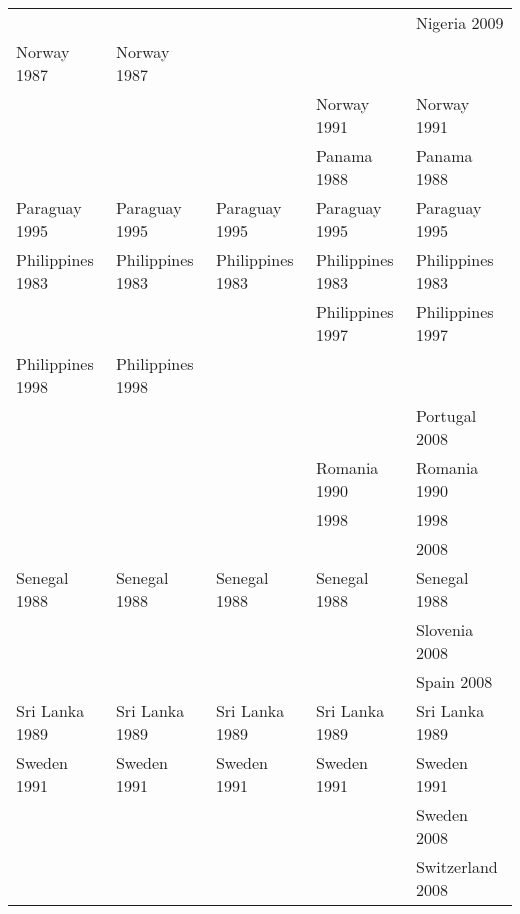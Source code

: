 \begin{table}[ht]
{\begin{tabular}{lllll}
   &  &  &  & Nigeria 2009\cellcolor[gray]{0.5} \\ 
  Norway 1987\cellcolor[gray]{0.5} & Norway 1987\cellcolor[gray]{0.5} &  &  &  \\ 
   &  &  & Norway 1991\cellcolor[gray]{0.5} & Norway 1991\cellcolor[gray]{0.5} \\ 
   &  &  & Panama 1988\cellcolor[gray]{0.5} & Panama 1988\cellcolor[gray]{0.5} \\ 
  Paraguay 1995\cellcolor[gray]{0.5} & Paraguay 1995\cellcolor[gray]{0.5} & Paraguay 1995\cellcolor[gray]{0.5} & Paraguay 1995\cellcolor[gray]{0.5} & Paraguay 1995\cellcolor[gray]{0.5} \\ 
  Philippines 1983\cellcolor[gray]{1} & Philippines 1983\cellcolor[gray]{1} & Philippines 1983\cellcolor[gray]{1} & Philippines 1983\cellcolor[gray]{1} & Philippines 1983\cellcolor[gray]{1} \\ 
   &  &  & Philippines 1997\cellcolor[gray]{0.5} & Philippines 1997\cellcolor[gray]{0.5} \\ 
  Philippines 1998\cellcolor[gray]{0.5} & Philippines 1998\cellcolor[gray]{0.5} &  &  &  \\ 
   &  &  &  & Portugal 2008\cellcolor[gray]{0.5} \\ 
   &  &  & Romania 1990\cellcolor[gray]{0.75} & Romania 1990\cellcolor[gray]{0.75} \\ 
   &  &  &  1998\cellcolor[gray]{0.5} &  1998\cellcolor[gray]{0.5} \\ 
   &  &  &  &  2008\cellcolor[gray]{0.5} \\ 
  Senegal 1988\cellcolor[gray]{0.5} & Senegal 1988\cellcolor[gray]{0.5} & Senegal 1988\cellcolor[gray]{0.5} & Senegal 1988\cellcolor[gray]{0.5} & Senegal 1988\cellcolor[gray]{0.5} \\ 
   &  &  &  & Slovenia 2008\cellcolor[gray]{0.5} \\ 
   &  &  &  & Spain 2008\cellcolor[gray]{0.5} \\ 
  Sri Lanka 1989\cellcolor[gray]{0.5} & Sri Lanka 1989\cellcolor[gray]{0.5} & Sri Lanka 1989\cellcolor[gray]{0.5} & Sri Lanka 1989\cellcolor[gray]{0.5} & Sri Lanka 1989\cellcolor[gray]{0.5} \\ 
  Sweden 1991\cellcolor[gray]{0.5} & Sweden 1991\cellcolor[gray]{0.5} & Sweden 1991\cellcolor[gray]{0.5} & Sweden 1991\cellcolor[gray]{0.5} & Sweden 1991\cellcolor[gray]{0.5} \\ 
   &  &  &  & Sweden 2008\cellcolor[gray]{0.5} \\ 
   &  &  &  & Switzerland 2008\cellcolor[gray]{0.5} \\ 

\end{tabular}}
\end{table}
